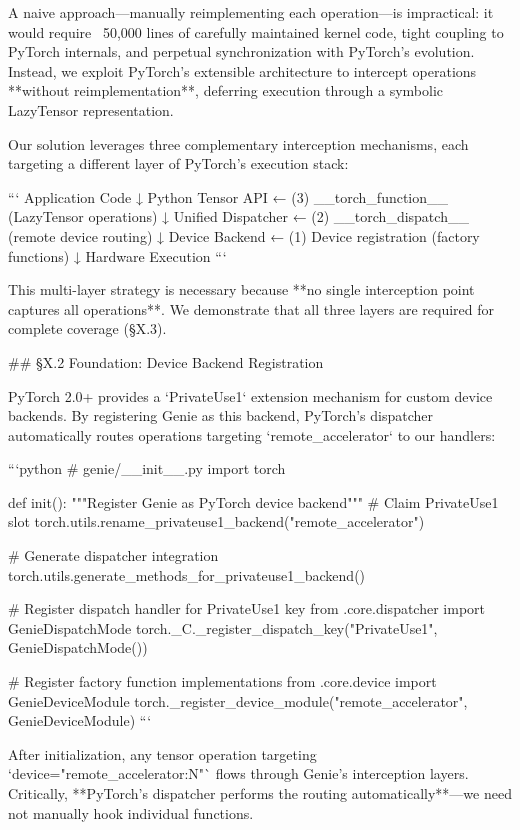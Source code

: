 A naive approach—manually reimplementing each operation—is impractical: it would require ~50,000 lines of carefully maintained kernel code, tight coupling to PyTorch internals, and perpetual synchronization with PyTorch's evolution. Instead, we exploit PyTorch's extensible architecture to intercept operations **without reimplementation**, deferring execution through a symbolic LazyTensor representation.

Our solution leverages three complementary interception mechanisms, each targeting a different layer of PyTorch's execution stack:

```
Application Code
      ↓
Python Tensor API      ← (3) __torch_function__ (LazyTensor operations)
      ↓  
Unified Dispatcher     ← (2) __torch_dispatch__ (remote device routing)
      ↓
Device Backend         ← (1) Device registration (factory functions)
      ↓
Hardware Execution
```

This multi-layer strategy is necessary because **no single interception point captures all operations**. We demonstrate that all three layers are required for complete coverage (§X.3).

## §X.2 Foundation: Device Backend Registration

PyTorch 2.0+ provides a `PrivateUse1` extension mechanism for custom device backends. By registering Genie as this backend, PyTorch's dispatcher automatically routes operations targeting `remote_accelerator` to our handlers:

```python
# genie/__init__.py
import torch

def init():
    """Register Genie as PyTorch device backend"""
    # Claim PrivateUse1 slot
    torch.utils.rename_privateuse1_backend("remote_accelerator")
    
    # Generate dispatcher integration
    torch.utils.generate_methods_for_privateuse1_backend()
    
    # Register dispatch handler for PrivateUse1 key
    from .core.dispatcher import GenieDispatchMode
    torch._C._register_dispatch_key("PrivateUse1", GenieDispatchMode())
    
    # Register factory function implementations  
    from .core.device import GenieDeviceModule
    torch._register_device_module("remote_accelerator", GenieDeviceModule)
```

After initialization, any tensor operation targeting `device="remote_accelerator:N"` flows through Genie's interception layers. Critically, **PyTorch's dispatcher performs the routing automatically**—we need not manually hook individual functions.

